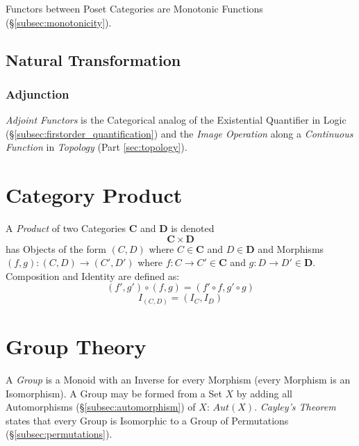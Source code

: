 \documentclass{article}
\begin{document}
Functors between Poset Categories are Monotonic Functions
(\S\ref{subsec:monotonicity}).

\subsection{Natural Transformation}\label{subsec:natural_transformation}

\subsubsection{Adjunction}\label{subsec:adjunction}

\emph{Adjoint Functors} is the Categorical analog of the Existential
Quantifier in Logic (\S\ref{subsec:firstorder_quantification}) and the
\emph{Image Operation} along a \emph{Continuous Function} in
\emph{Topology} (Part \ref{sec:topology}).

\section{Category Product}\label{sec:category_product}

A \emph{Product} of two Categories $\mathbf{C}$ and $\mathbf{D}$ is
denoted
\[
    \mathbf{C} \times \mathbf{D}
\]
has Objects of the form $(C,D)$ where $C \in \mathbf{C}$ and $D \in
\mathbf{D}$ and Morphisms $(f,g) : (C,D) \rightarrow (C',D')$ where $f
: C \rightarrow C' \in \mathbf{C}$ and $g : D \rightarrow D' \in
\mathbf{D}$. Composition and Identity are defined as:
\[
    (f',g') \circ (f,g) = (f' \circ f,g' \circ g)
\]\[
    I_{(C,D)} = (I_C, I_D)
\]

\section{Group Theory}

A \emph{Group} is a Monoid with an Inverse for every Morphism (every
Morphism is an Isomorphism). A Group may be formed from a Set $X$ by
adding all Automorphisms (\S\ref{subsec:automorphism}) of $X$:
$Aut(X)$. \emph{Cayley's Theorem} states that every Group is
Isomorphic to a Group of Permutations (\S\ref{subsec:permutations}).
\end{document}
